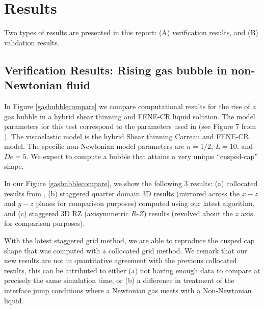 \documentclass[]{article}
\begin{document}
\section{Results} 

Two types of results are presented in this report: (A) verification results, 
and (B) validation results.

\subsection{Verification Results: Rising gas bubble in non-Newtonian fluid}

In Figure \ref{gasbubblecompare} we compare computational results
for the rise of a gas bubble in a hybrid shear thinning and
FENE-CR liquid solution\cite{OHTA201966}.  The model parameters
for this test correspond to the parameters used in \cite{OHTA201966}
(see Figure 7 from \cite{OHTA201966}).  
The viscoelastic model is the hybrid
Shear thinning Carreau and FENE-CR model.  The specific non-Newtonian
model parameters are $n=1/2$, $L=10$, and $De=5$.
We expect to compute a bubble that attains
a very unique ``cusped-cap'' shape.

In our Figure \ref{gasbubblecompare}, we show the following 3 results:
(a) collocated results from \cite{OHTA201966},
(b) staggered quarter domain 3D results (mirrored across the $x-z$ and $y-z$ 
planes for comparison purposes) computed using our latest algorithm,
and 
(c) staggered 3D RZ (axisymmetric $R$-$Z$) results (revolved about the 
$z$ axis for comparison purposes).

With the latest staggered grid method, we are able to reproduce the cusped
cap shape that was computed with a collocated grid method.  
We remark that our new results are not in quantitative 
agreement with the previous collocated results, this can be attributed to 
either (a) not having enough data to compare at precisely the same
simulation time, or (b) a difference in treatment of the interface
jump conditions where a Newtonian gas meets with a Non-Newtonian 
liquid.
\end{document}
